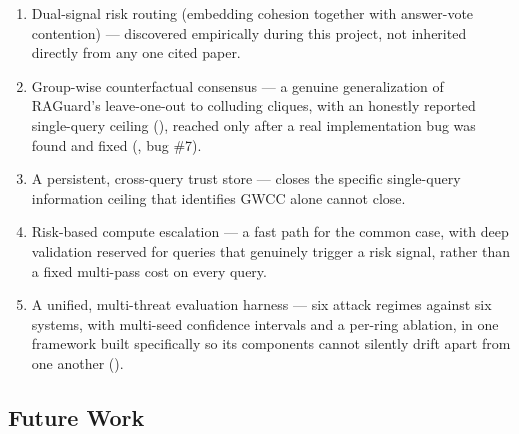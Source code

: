 \begin{enumerate}
\item Dual-signal risk routing (embedding cohesion together with
  answer-vote contention) --- discovered empirically during this project,
  not inherited directly from any one cited paper.
\item Group-wise counterfactual consensus --- a genuine generalization of
  RAGuard's leave-one-out to colluding cliques, with an honestly reported
  single-query ceiling (), reached only after a real
  implementation bug was found and fixed (, bug \#7).
\item A persistent, cross-query trust store --- closes the specific
  single-query information ceiling that  identifies
  GWCC alone cannot close.
\item Risk-based compute escalation --- a fast path for the common case,
  with deep validation reserved for queries that genuinely trigger a risk
  signal, rather than a fixed multi-pass cost on every query.
\item A unified, multi-threat evaluation harness --- six attack regimes
  against six systems, with multi-seed confidence intervals and a
  per-ring ablation, in one framework built specifically so its
  components cannot silently drift apart from one another
  ().
\end{enumerate}

\subsection{Future Work}
\label{sec:future-work}

